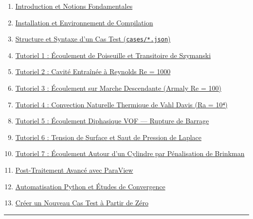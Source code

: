 \documentclass[
  french,
]{article}
\providecommand{\tightlist}{%
  \setlength{\itemsep}{0pt}\setlength{\parskip}{0pt}}
\begin{document}
\begin{enumerate}
\def\labelenumi{\arabic{enumi}.}
\tightlist
\item
  \hyperref[1-introduction-et-notions-fondamentales]{Introduction et
  Notions Fondamentales}
\item
  \hyperref[2-installation-et-environnement-de-compilation]{Installation
  et Environnement de Compilation}
\item
  \hyperref[3-structure-et-syntaxe-dun-cas-test-casesjson]{Structure et
  Syntaxe d'un Cas Test (\texttt{cases/*.json})}
\item
  \hyperref[4-tutoriel-1--uxe9coulement-de-poiseuille-et-transitoire-de-szymanski]{Tutoriel
  1 : Écoulement de Poiseuille et Transitoire de Szymanski}
\item
  \hyperref[5-tutoriel-2--cavituxe9-entrauxeenuxe9e-uxe0-reynolds-re--1000]{Tutoriel
  2 : Cavité Entraînée à Reynolds Re = 1000}
\item
  \hyperref[6-tutoriel-3--uxe9coulement-sur-marche-descendante-armaly-re--100]{Tutoriel
  3 : Écoulement sur Marche Descendante (Armaly Re = 100)}
\item
  \hyperref[7-tutoriel-4--convection-naturelle-thermique-de-vahl-davis-ra--10ux2074]{Tutoriel
  4 : Convection Naturelle Thermique de Vahl Davis (Ra = 10⁴)}
\item
  \hyperref[8-tutoriel-5--uxe9coulement-diphasique-vof--rupture-de-barrage]{Tutoriel
  5 : Écoulement Diphasique VOF --- Rupture de Barrage}
\item
  \hyperref[9-tutoriel-6--tension-de-surface-et-saut-de-pression-de-laplace]{Tutoriel
  6 : Tension de Surface et Saut de Pression de Laplace}
\item
  \hyperref[10-tutoriel-7--uxe9coulement-autour-dun-cylindre-par-puxe9nalisation-de-brinkman]{Tutoriel
  7 : Écoulement Autour d'un Cylindre par Pénalisation de Brinkman}
\item
  \hyperref[11-post-traitement-avancuxe9-avec-paraview]{Post-Traitement
  Avancé avec ParaView}
\item
  \hyperref[12-automatisation-python-et-uxe9tudes-de-convergence]{Automatisation
  Python et Études de Convergence}
\item
  \hyperref[13-cruxe9er-un-nouveau-cas-test-uxe0-partir-de-zuxe9ro]{Créer
  un Nouveau Cas Test à Partir de Zéro}
\end{enumerate}

\begin{center}\rule{0.5\linewidth}{0.5pt}\end{center}
\end{document}
